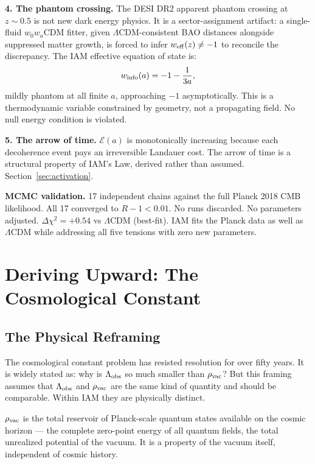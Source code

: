 \documentclass[12pt,a4paper]{article}
\begin{document}
\textbf{4. The phantom crossing.}
The DESI DR2 apparent phantom crossing at $z \sim 0.5$ is not new dark energy
physics. It is a sector-assignment artifact: a single-fluid $w_0 w_a$CDM
fitter, given $\Lambda$CDM-consistent BAO distances alongside suppressed matter
growth, is forced to infer $w_{\rm eff}(z) \neq -1$ to reconcile the
discrepancy. The IAM effective equation of state is:
\begin{equation}
w_{\rm info}(a) = -1 - \frac{1}{3a},
\end{equation}
mildly phantom at all finite $a$, approaching $-1$ asymptotically.
This is a thermodynamic variable constrained by geometry, not a propagating
field. No null energy condition is violated.

\textbf{5. The arrow of time.}
$\mathcal{E}(a)$ is monotonically increasing because each decoherence event
pays an irreversible Landauer cost. The arrow of time is a structural property
of IAM's Law, derived rather than assumed. Section~\ref{sec:activation}.

\textbf{MCMC validation.}
17 independent chains against the full Planck 2018 CMB likelihood. All 17
converged to $R-1 < 0.01$. No runs discarded. No parameters adjusted.
$\Delta\chi^2 = +0.54$ vs $\Lambda$CDM (best-fit). IAM fits the Planck data
as well as $\Lambda$CDM while addressing all five tensions with zero new
parameters.

\newpage

\section{Deriving Upward: The Cosmological Constant}
\label{sec:cc}

\subsection{The Physical Reframing}

The cosmological constant problem has resisted resolution for over fifty years.
It is widely stated as: why is $\Lambda_{\rm obs}$ so much smaller than
$\rho_{\rm vac}$? But this framing assumes that $\Lambda_{\rm obs}$ and
$\rho_{\rm vac}$ are the same kind of quantity and should be comparable.
Within IAM they are physically distinct.

$\rho_{\rm vac}$ is the total reservoir of Planck-scale quantum states available
on the cosmic horizon --- the complete zero-point energy of all quantum fields,
the total unrealized potential of the vacuum. It is a property of the vacuum
itself, independent of cosmic history.
\end{document}
